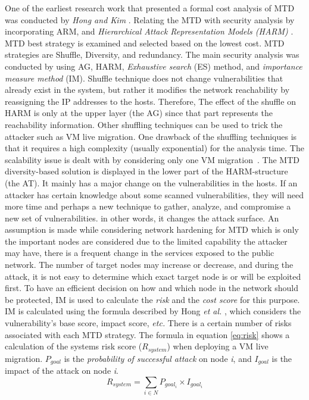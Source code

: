 One of the earliest research work that presented a formal cost analysis of MTD was conducted by \textit{Hong and Kim} . Relating the MTD with security analysis by incorporating ARM, and \textit{Hierarchical Attack Representation Models (HARM)} . MTD best strategy is examined and selected based on the lowest cost. MTD strategies are Shuffle, Diversity, and redundancy. The main security analysis was conducted by using AG, HARM, \textit{Exhaustive search}  (ES) method, and \textit{importance measure method} (IM).
Shuffle technique does not change vulnerabilities that already exist in the system, but rather it modifies the network reachability by reassigning the IP addresses to the hosts. Therefore, The effect of the shuffle on HARM is only at the upper layer (the AG) since that part represents the reachability information. Other shuffling techniques can be used to trick the attacker such as VM live migration.  One drawback of the shuffling techniques is that it requires a high complexity (usually exponential) for the analysis time. The scalability issue is dealt with by considering only one VM migration~. 
The MTD diversity-based solution is displayed in the lower part of the HARM-structure (the AT). It mainly has a major change on the vulnerabilities in the hosts. If an attacker has certain knowledge about some scanned vulnerabilities, they will need more time and perhaps a new technique to gather, analyze, and compromise a new set of vulnerabilities. in other words, it changes the attack surface. An assumption is made while considering network hardening for MTD which is only the important nodes are considered due to the limited capability the attacker may have, there is a frequent change in the services exposed to the public network. The number of target nodes may increase or decrease, and during the attack, it is not easy to determine which exact target node is or will be exploited first. To have an efficient decision on how and which node in the network should be protected, IM is used to calculate the \textit{risk} and the \textit{cost score} for this purpose. IM is calculated using the formula described by Hong \textit{et al.} , which considers the vulnerability's base score, impact score, {\em etc.} 
There is a certain number of risks associated with each MTD strategy. The formula in equation \ref{eq:risk} shows a calculation of the systems risk score ($R_{system}$) when deploying a VM live migration.   $P_{goal}$ is the \textit{probability of successful attack} on node \textit{i}, and $I_{goal}$ is the impact of the attack on node \textit{i}. 
\begin{equation}
    R_{system} = \sum_{i\in N} P_{goal_i } \times I_{goal_i}
\label{eq:risk}
\end{equation}

